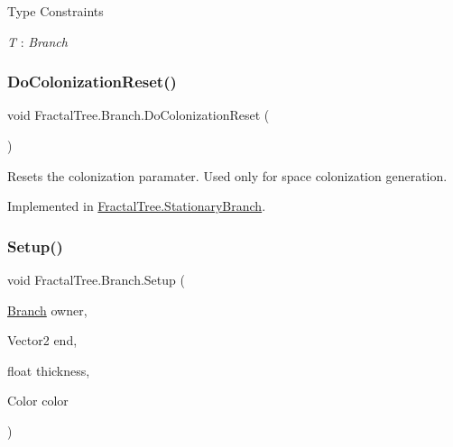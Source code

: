 \begin{Desc}
\item[Type Constraints]\begin{description}
\item[{\em T} : {\em Branch}]\end{description}
\end{Desc}
\hypertarget{interface_fractal_tree_1_1_branch_a4460379e72ec587f890b1e0cf77dbc3c}{}\label{interface_fractal_tree_1_1_branch_a4460379e72ec587f890b1e0cf77dbc3c} 
\subsubsection{\texorpdfstring{Do\+Colonization\+Reset()}{DoColonizationReset()}}
{\footnotesize\ttfamily void Fractal\+Tree.\+Branch.\+Do\+Colonization\+Reset (\begin{DoxyParamCaption}{ }\end{DoxyParamCaption})}



Resets the colonization paramater. Used only for space colonization generation. 



Implemented in \hyperlink{class_fractal_tree_1_1_stationary_branch_a57a5b1cbc9fd081c5b8cb41b61d24502}{Fractal\+Tree.\+Stationary\+Branch}.

\hypertarget{interface_fractal_tree_1_1_branch_a1bad78362d67435aed4538b207f4155b}{}\label{interface_fractal_tree_1_1_branch_a1bad78362d67435aed4538b207f4155b} 
\subsubsection{\texorpdfstring{Setup()}{Setup()}\hspace{0.1cm}{\footnotesize\ttfamily [1/4]}}
{\footnotesize\ttfamily void Fractal\+Tree.\+Branch.\+Setup (\begin{DoxyParamCaption}\item[{\hyperlink{interface_fractal_tree_1_1_branch}{Branch}}]{owner,  }\item[{Vector2}]{end,  }\item[{float}]{thickness,  }\item[{Color}]{color }\end{DoxyParamCaption})}




